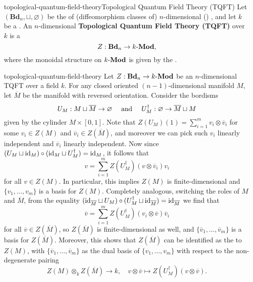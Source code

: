 \begin{topic}{topological-quantum-field-theory}{Topological Quantum Field Theory (TQFT)}
    Let $(\textbf{Bd}_n, \sqcup, \varnothing)$ be the  of (diffeomorphism classes of) $n$-dimensional () , and let $k$ be a . An $n$-dimensional \textbf{Topological Quantum Field Theory (TQFT)} over $k$ is a 
    \[ Z : \textbf{Bd}_n \to k\textup{-}\textbf{Mod} , \]
    where the monoidal structure on $k\textup{-}\textbf{Mod}$ is given by the .
\end{topic}


\begin{example}{topological-quantum-field-theory}
    Let $Z : \textbf{Bd}_n \to k\textup{-}\textbf{Mod}$ be an $n$-dimensional TQFT over a field $k$. For any closed oriented $(n - 1)$-dimensional manifold $M$, let $\overline{M}$ be the manifold with reversed orientation. Consider the bordisms
    \[ U_M : M \sqcup \overline{M} \to \varnothing \quad \textup{ and } \quad U_M^\dag : \varnothing \to \overline{M} \sqcup M \]
    given by the cylinder $M \times [0, 1]$.
    Note that $Z(U_M)(1) = \sum_{i = 1}^{m} v_i \otimes \overline{v}_i$ for some $v_i \in Z(M)$ and $\overline{v}_i \in Z(\overline{M})$, and moreover we can pick such $v_i$ linearly independent and $\overline{v}_i$ linearly independent.
    Now since $(U_M \sqcup \text{id}_M) \circ (\text{id}_M \sqcup U_M^\dag) = \text{id}_M$, it follows that
    \[ v = \sum_{i = 1}^{m} Z(U_M^\dag)(v \otimes \overline{v}_i) v_i \]
    for all $v \in Z(M)$. In particular, this implies $Z(M)$ is finite-dimensional and $\{ v_1, \ldots, v_m \}$ is a basis for $Z(M)$.
    Completely analogous, switching the roles of $M$ and $\overline{M}$, from the equality $(\text{id}_{\overline{M}} \sqcup U_M) \circ (U_M^\dag \sqcup \text{id}_{\overline{M}}) = \text{id}_{\overline{M}}$ we find that
    \[ \overline{v} = \sum_{i = 1}^{m} Z(U_M^\dag)(v_i \otimes \overline{v}) \overline{v}_i \]
    for all $\overline{v} \in Z(\overline{M})$, so $Z(\overline{M})$ is finite-dimensional as well, and $\{ \overline{v}_1, \ldots, \overline{v}_m \}$ is a basis for $Z(\overline{M})$. Moreover, this shows that $Z(\overline{M})$ can be identified as the  to $Z(M)$, with $\{ \overline{v}_1, \ldots, \overline{v}_m \}$ as the dual basis of $\{ v_1, \ldots, v_m \}$ with respect to the non-degenerate pairing
    \[ Z(M) \otimes_k Z(\overline{M}) \to k, \quad v \otimes \overline{v} \mapsto Z(U_M^\dagger)(v \otimes \overline{v}) . \]
\end{example}
